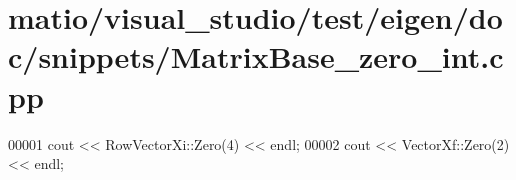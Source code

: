 \hypertarget{matio_2visual__studio_2test_2eigen_2doc_2snippets_2_matrix_base__zero__int_8cpp_source}{}\section{matio/visual\+\_\+studio/test/eigen/doc/snippets/\+Matrix\+Base\+\_\+zero\+\_\+int.cpp}
\label{matio_2visual__studio_2test_2eigen_2doc_2snippets_2_matrix_base__zero__int_8cpp_source}

\begin{DoxyCode}
00001 cout << RowVectorXi::Zero(4) << endl;
00002 cout << VectorXf::Zero(2) << endl;
\end{DoxyCode}
